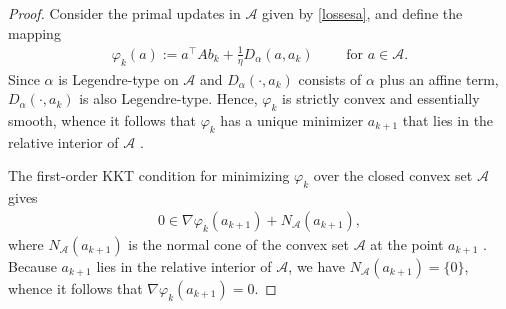 \documentclass[11pt]{article}
\newcommand{\A}{\mathcal{A}}
\begin{document}
\begin{proof}
    Consider the primal updates in $\A$ given by \eqref{lossesa}, and define the mapping
    \begin{gather*}
        \varphi_k(a):=a^{\top}Ab_k+\frac{1}{\eta}D_{\alpha}\left(a,a_k\right)\qquad \text{ for }a\in\mathcal{A}.
    \end{gather*}
    Since $\alpha$ is Legendre-type on $\A$ and $D_{\alpha}\left(\cdot,a_k\right)$ consists of $\alpha$ plus an affine term, $D_{\alpha}\left(\cdot,a_k\right)$ is also Legendre-type. Hence, $\varphi_k$ is strictly convex and essentially smooth, whence it follows that $\varphi_k$ has a unique minimizer $a_{k+1}$ that lies in the relative interior of $\A$ \cite[Sections 26 and 27]{Rockafellar1996}.
    
    The first-order KKT condition for minimizing $\varphi_k$ over the closed convex set $\A$ gives
    \begin{gather*}
        0\in \nabla\varphi_k\left(a_{k+1}\right)+N_{\A}\left(a_{k+1}\right),
    \end{gather*}
    where $N_{\A}\left(a_{k+1}\right)$ is the normal cone of the convex set $\A$ at the point $a_{k+1}$ \citep[Definition~2.7 and Theorem~27.4]{Rockafellar1996}. Because $a_{k+1}$ lies in the relative interior of $\A$, we have $N_{\A}\left(a_{k+1}\right)=\{0\}$, whence it follows that $\nabla\varphi_k\left(a_{k+1}\right)=0$. 
    

\end{proof}
\end{document}
